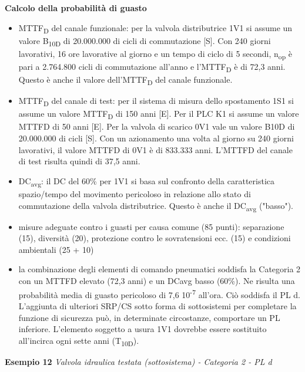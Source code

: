\textbf{Calcolo della probabilità di guasto}
\begin{itemize}
    \item MTTF\textsubscript{D} del canale funzionale: per la valvola distributrice 1V1 si assume un valore B\textsubscript{10D} di 20.000.000 di cicli di commutazione [S]. Con 240 giorni lavorativi, 16 ore lavorative al giorno e un tempo di ciclo di 5 secondi, n\textsubscript{op} è pari a 2.764.800 cicli di commutazione all'anno e l'MTTF\textsubscript{D} è di 72,3 anni. Questo è anche il valore dell'MTTF\textsubscript{D} del canale funzionale.
    \item MTTF\textsubscript{D} del canale di test: per il sistema di misura dello spostamento 1S1 si assume un valore MTTF\textsubscript{D} di 150 anni [E]. Per il PLC K1 si assume un valore MTTFD di 50 anni [E]. Per la valvola di scarico 0V1 vale un valore B10D di 20.000.000 di cicli [S]. Con un azionamento una volta al giorno su 240 giorni lavorativi, il valore MTTFD di 0V1 è di 833.333 anni. L'MTTFD del canale di test risulta quindi di 37,5 anni.
    \item DC\textsubscript{avg}: il DC del 60\% per 1V1 si basa sul confronto della caratteristica spazio/tempo del movimento pericoloso in relazione allo stato di commutazione della valvola distributrice. Questo è anche il DC\textsubscript{avg} ("basso").
    \item misure adeguate contro i guasti per causa comune (85 punti): separazione (15), diversità (20), protezione contro le sovratensioni ecc. (15) e condizioni ambientali (25 + 10)
    \item la combinazione degli elementi di comando pneumatici soddisfa la Categoria 2 con un MTTFD elevato (72,3 anni) e un DCavg basso (60\%). Ne risulta una probabilità media di guasto pericoloso di 7,6 10\textsuperscript{-7} all'ora. Ciò soddisfa il PL d. L'aggiunta di ulteriori SRP/CS sotto forma di sottosistemi per completare la funzione di sicurezza può, in determinate circostanze, comportare un PL inferiore. L'elemento soggetto a usura 1V1 dovrebbe essere sostituito all'incirca ogni sette anni (T\textsubscript{10D}).
\end{itemize}
\clearpage

\textbf{Esempio 12}
\textit{Valvola idraulica testata (sottosistema) - Categoria 2 - PL d}

\begin{center}
    \begin{minipage}{\textwidth}
        \centering
        \captionsetup{hypcap=false}
        \resizebox{0.83\textwidth}{!}{}
        \label{fig:08-23}
    \end{minipage}
\end{center}


